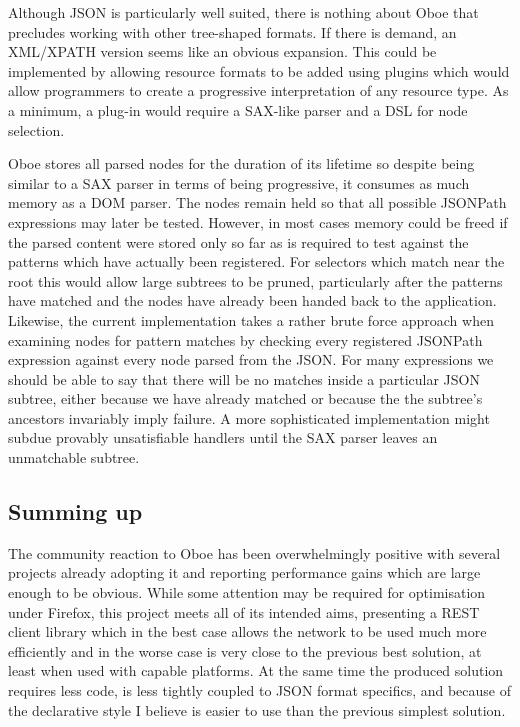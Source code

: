\documentclass[12pt, ]{article}
\begin{document}
Although JSON is particularly well suited, there is nothing about Oboe
that precludes working with other tree-shaped formats. If there is
demand, an XML/XPATH version seems like an obvious expansion. This could
be implemented by allowing resource formats to be added using plugins
which would allow programmers to create a progressive interpretation of
any resource type. As a minimum, a plug-in would require a SAX-like
parser and a DSL for node selection.

Oboe stores all parsed nodes for the duration of its lifetime so despite
being similar to a SAX parser in terms of being progressive, it consumes
as much memory as a DOM parser. The nodes remain held so that all
possible JSONPath expressions may later be tested. However, in most
cases memory could be freed if the parsed content were stored only so
far as is required to test against the patterns which have actually been
registered. For selectors which match near the root this would allow
large subtrees to be pruned, particularly after the patterns have
matched and the nodes have already been handed back to the application.
Likewise, the current implementation takes a rather brute force approach
when examining nodes for pattern matches by checking every registered
JSONPath expression against every node parsed from the JSON. For many
expressions we should be able to say that there will be no matches
inside a particular JSON subtree, either because we have already matched
or because the the subtree's ancestors invariably imply failure. A more
sophisticated implementation might subdue provably unsatisfiable
handlers until the SAX parser leaves an unmatchable subtree.

\subsection{Summing up}\label{summing-up}

The community reaction to Oboe has been overwhelmingly positive with
several projects already adopting it and reporting performance gains
which are large enough to be obvious. While some attention may be
required for optimisation under Firefox, this project meets all of its
intended aims, presenting a REST client library which in the best case
allows the network to be used much more efficiently and in the worse
case is very close to the previous best solution, at least when used
with capable platforms. At the same time the produced solution requires
less code, is less tightly coupled to JSON format specifics, and because
of the declarative style I believe is easier to use than the previous
simplest solution.
\end{document}
